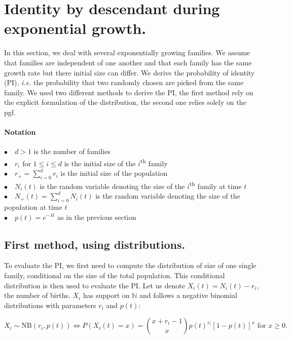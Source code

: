 \documentclass{article}
\begin{document}
 
 \section{Identity by descendant during exponential growth.}
 In this section, we deal with several exponentially growing families. We assume that families are independent of one another and that each family has the same growth rate but there initial size can differ. We derive the probability of identity (PI), \textit{i.e.} the probability that two randomly chosen are picked from the same family. We used two different methods to derive the PI, the first method rely on the explicit formulation of the distribution, the second one relies solely on the pgf.
 \\
  \paragraph{Notation} $ $\\
 $\bullet \quad d>1$ is the number of families\\
 $\bullet \quad r_i $ for $1 \leq i \leq d$ is the initial size of the $i$\textsuperscript{th} family\\
 $\displaystyle \bullet \quad r_+=\sum_{i=0}^d r_i$ is the initial size of the population \\
 $\bullet \quad N_i(t) $ is the random variable denoting the size of the $i$\textsuperscript{th} family at time $t$ \\
 $\displaystyle \bullet \quad N_+(t)=\sum_{i=0}^d N_i(t)$ is the random variable denoting the size of the population at time $t$ \\
 $\bullet \quad p(t)=e^{-\lambda t} $ as in the previous section\\
 
 \subsection{First method, using distributions.}
  To evaluate the PI, we first need to compute the distribution of size of one single family, conditional on the size of the total population. This conditional distribution is then used to evaluate the PI.
 Let us denote $X_i(t)=N_i(t)-r_i$, the number of births. $X_i$ has support on $\mathbb{N}$ and follows a negative binomial distributions with parameters $r_i$ and $p(t)$:

\begin{equation}
X_i \sim \textrm{NB}(r_i,p(t)) \iff P(X_i(t)=x)=\binom{x+r_i-1}{x} p(t)^{r_i} [1-p(t)]^{x} \text{ for } x \geq 0.
\end{equation}
\end{document}
